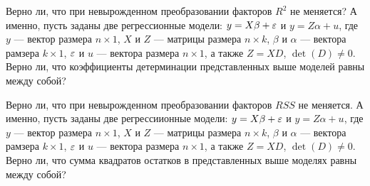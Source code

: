 \documentclass[pdftex,11pt,openany]{book}\usepackage[]{graphicx}\usepackage[]{color}
\begin{document}
\begin{problem}
Верно ли, что при невырожденном преобразовании факторов $R^2$ не меняется? А именно, пусть заданы две регрессионные модели: $y = X\beta + \varepsilon$ и $y = Z\alpha + u$, где $y$ --- вектор размера $n \times 1$, $X$ и $Z$ --- матрицы размера $n \times k$, $\beta$ и $\alpha$ --- вектора рамзера $k \times 1$, $\varepsilon$ и $u$ --- вектора размера $n \times 1$, а также $Z=XD$, $\det(D) \not= 0.$ Верно ли, что коэффициенты детерминации представленных выше моделей равны между собой?
\end{problem}
\begin{solution}
\end{solution}


\begin{problem}
Верно ли, что при невырожденном преобразовании факторов $RSS$ не меняется. А именно, пусть заданы две регрессиионные модели: $y = X\beta + \varepsilon$ и $y = Z\alpha + u$, где $y$ --- вектор размера $n \times 1$, $X$ и $Z$ --- матрицы размера $n \times k$, $\beta$ и $\alpha$ --- вектора рамзера $k \times 1$, $\varepsilon$ и $u$ --- вектора размера $n \times 1$, а также $Z=XD$, $\det(D) \not= 0.$ Верно ли, что сумма квадратов остатков в представленных выше моделях равны между собой?
\end{problem}
\begin{solution}
\end{solution}
\end{document}
